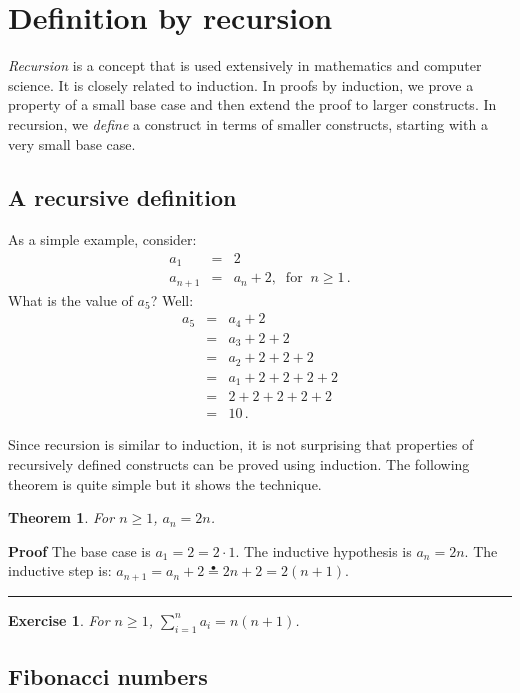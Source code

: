 \documentclass[11pt,a4paper]{report}
\newcommand*{\ih}{\stackrel{\bullet}{=}}
\newcommand*{\qed}{\hfill\rule{1ex}{1.5ex}}
\newtheorem{theorem}{Theorem}
\newtheorem{exercise}{Exercise}
\begin{document}
\section{Definition by recursion}

\emph{Recursion} is a concept that is used extensively in mathematics and computer science. It is closely related to induction. In proofs by induction, we prove a property of a small base case and then extend the proof to larger constructs. In recursion, we \emph{define} a construct in terms of smaller constructs, starting with a very small base case.

\subsection*{A recursive definition}

As a simple example, consider:
\begin{eqnarray*}
a_1 &=& 2\\
a_{n+1} &=& a_n + 2, \;\;\textrm{for}\;\; n\geq 1\,.
\end{eqnarray*}
What is the value of $a_5$? Well:
\begin{eqnarray*}
a_5 &=& a_4 + 2\\
&=& a_3+2+2\\
&=& a_2+2+2+2\\
&=& a_1+2+2+2+2\\
&=& 2+2+2+2+2\\
&=&10\,.
\end{eqnarray*}

Since recursion is similar to induction, it is not surprising that properties of recursively defined constructs can be proved using induction. The following theorem is quite simple but it shows the technique.

\begin{theorem}\label{t.recursive}
For $n\geq 1$, $a_n = 2n$.
\end{theorem}

\textbf{Proof} The base case is $a_1=2=2\cdot 1$. The inductive hypothesis is $a_n = 2n$. The inductive step is: $a_{n+1} = a_n + 2 \ih{} 2n + 2 = 2(n+1)$.\qed

\begin{exercise}
For $n\geq 1$, $\sum_{i=1}^n a_i = n(n+1)$.
\end{exercise}

\subsection*{Fibonacci numbers}
\end{document}
